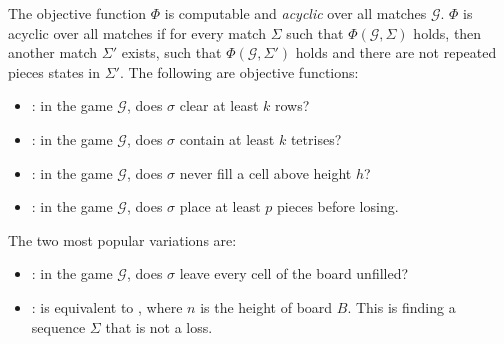 The objective function $\Phi$ is computable and \emph{acyclic} over all matches $\mathcal{G}$. $\Phi$ is acyclic over all matches if for every match $\Sigma$ such that $\Phi(\mathcal{G}, \Sigma)$ holds, then another match $\Sigma'$ exists, such that  $\Phi(\mathcal{G},\Sigma')$ holds and there are not repeated pieces states in $\Sigma'$. The following are objective functions:

\begin{itemize}
  \item {}: in the game $\mathcal{G}$, does $\sigma$ clear at least $k$ rows?
  \item {}: in the game $\mathcal{G}$, does $\sigma$ contain at least $k$ tetrises?
  \item {}: in the game $\mathcal{G}$, does $\sigma$ never fill a cell above height $h$?
  \item {}: in the game $\mathcal{G}$, does $\sigma$ place at least $p$ pieces before losing.
\end{itemize} 

The two most popular variations are:

\begin{itemize} \index{\clearing} \index{\survival}
  \item \clearing: in the game $\mathcal{G}$, does $\sigma$ leave every cell of the board unfilled?
  \item \survival: is equivalent to , where $n$ is the height of board $B$. This is finding a sequence $\Sigma$ that is not a loss.
\end{itemize}

